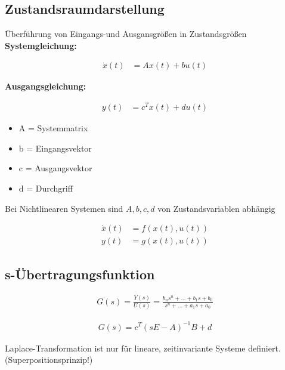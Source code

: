 \documentclass[10pt,a4paper]{article}
\begin{document}
  \subsection{Zustandsraumdarstellung}
  Überführung von Eingangs-und Ausgansgrößen in Zustandsgrößen \\
\textbf{Systemgleichung:}
  \begin{mdframed}[style=exercise]
    \begin{align}
        \dot{x}(t) &= Ax(t) + bu(t)
    \end{align}
  \end{mdframed}
\textbf{Ausgangsgleichung:}
  \begin{mdframed}[style=exercise]
    \begin{align}
        y(t) &= c^T x(t) + du(t)
    \end{align}
  \end{mdframed}
  \begin{itemize}
    \item A = Systemmatrix
    \item b = Eingangsvektor
    \item c = Ausgangsvektor
    \item d = Durchgriff
  \end{itemize}
  Bei Nichtlinearen Systemen sind $A,b,c,d$ von Zustandsvariablen abhängig
  \begin{mdframed}[style=exercise]
    \begin{align}
        \dot{x}(t) &= f(x(t),u(t)) \\
        y(t) &= g(x(t),u(t))
    \end{align}
  \end{mdframed}

  \subsection{s-Übertragungsfunktion}
  \begin{mdframed}[style=exercise]
    \begin{align}
        G(s)=\frac{Y(s)}{U(s)}= \frac{b_n s^{n}+...+b_1s+b_0 } {s^{n}+...+a_1s+a_0 }
    \end{align}
  \end{mdframed}

  \begin{mdframed}[style=exercise]
    \begin{align}
        G(s)= c^T (sE-A)^{-1} B + d
    \end{align}
  \end{mdframed}
  Laplace-Transformation ist nur für lineare, zeitinvariante Systeme definiert. (Superpositionsprinzip!)
\end{document}
